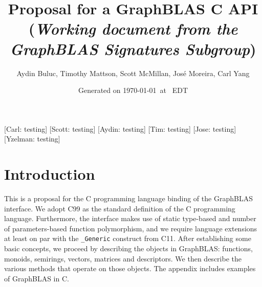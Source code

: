 \documentclass[11pt]{extarticle}
\begin{document}
\linenumbers

\title{Proposal for a GraphBLAS C API\\ (\emph{\large Working document from the \emph{GraphBLAS} Signatures Subgroup})}
\author{Aydin Buluc, Timothy Mattson, Scott McMillan, Jos\'e Moreira, Carl Yang}
\date{Generated on \today\ at \currenttime\ EDT}

\renewcommand{\vector}[1]{{\bf #1}}
\renewcommand{\matrix}[1]{{\bf #1}}
\newcommand{\zip}{{\mbox{zip}}}
\newcommand{\zap}{{\mbox{zap}}}
\newcommand{\ewiseadd}{{\mbox{\bf ewiseadd}}}
\newcommand{\ewisemult}{{\mbox{\bf ewisemult}}}
\newcommand{\mxm}{{\mbox{\bf mxm}}}
\newcommand{\vxm}{{\mbox{\bf vxm}}}
\newcommand{\mxv}{{\mbox{\bf mxv}}}
\newcommand{\gpit}[1]{{\sf #1}}
\newcommand{\ie}{\emph{i.e.}}
\newcommand{\eg}{\emph{e.g.}}
\newcommand{\nan}{{\sf NaN}}
\newcommand{\nil}{{\bf nil}}
\newcommand{\ifif}{{\bf if}}
\newcommand{\ifthen}{{\bf then}}
\newcommand{\ifelse}{{\bf else}}
\newcommand{\ifendif}{{\bf endif}}
\newcommand{\zero}{{\bf 0}}
\newcommand{\one}{{\bf 1}}

\newcommand{\aydin}[1]{{{\color{orange}[Aydin: #1]}}}
\newcommand{\scott}[1]{{{\color{violet}[Scott: #1]}}}
\newcommand{\tim}[1]{{{\color{teal}[Tim: #1]}}}
\newcommand{\jose}[1]{{{\color{red}[Jose: #1]}}}
\newcommand{\carl}[1]{{{\color{blue}[Carl: #1]}}}
\newcommand{\ajy}[1]{{{\color{brown}[Yzelman: #1]}}}
\renewcommand{\comment}[1]{{}}

\setlength{\parskip}{0.5\baselineskip}
\setlength{\parindent}{0ex}

\maketitle

\carl{testing}
\scott{testing}
\aydin{testing}
\tim{testing}
\jose{testing}
\ajy{testing}

\begin{abstract}
\end{abstract}

\pagebreak
\tableofcontents
\pagebreak

\section{Introduction}

This is a proposal for the C programming language binding of the GraphBLAS
interface. We adopt C99 as the standard definition of the C programming
language. Furthermore, the interface makes use of static type-based and
number of parameters-based function polymorphism, and we require language
extensions at least on par with the {\tt \_Generic} construct from C11.
After establishing some basic concepts, we proceed by describing the
objects in GraphBLAS: functions, monoids, semirings, vectors, matrices
and descriptors. We then describe the various methods that operate on
those objects. The appendix includes examples of GraphBLAS in C.
\end{document}
